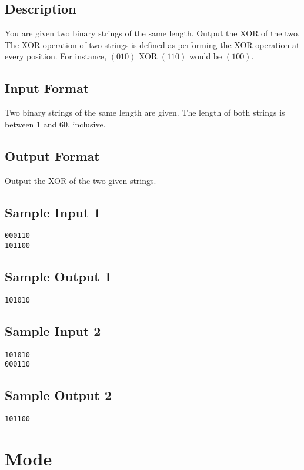 \subsection*{Description}
You are given two binary strings of the same length. Output the XOR of the two.  The XOR operation of two strings is defined as performing the XOR operation at every position. For instance, $(010)$ XOR $(110)$ would be $(100)$. 

\subsection*{Input Format}
Two binary strings of the same length are given. The length of both strings is between $1$ and $60$, inclusive. 

\subsection*{Output Format}
Output the XOR of the two given strings.

\subsection*{Sample Input 1}
\begin{verbatim}
000110
101100
\end{verbatim}

\subsection*{Sample Output 1}
\begin{verbatim}
101010
\end{verbatim}

\subsection*{Sample Input 2}
\begin{verbatim}
101010
000110
\end{verbatim}

\subsection*{Sample Output 2}
\begin{verbatim}
101100
\end{verbatim}

\newpage


\section{Mode}

